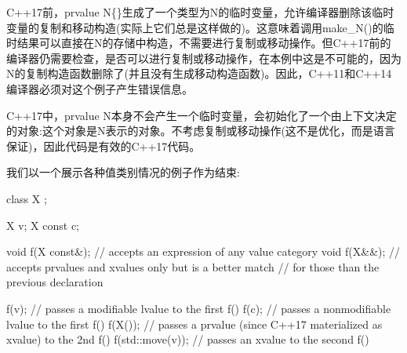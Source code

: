 C++17前，prvalue N\{\}生成了一个类型为N的临时变量，允许编译器删除该临时变量的复制和移动构造(实际上它们总是这样做的)。这意味着调用make\_N()的临时结果可以直接在N的存储中构造，不需要进行复制或移动操作。但C++17前的编译器仍需要检查，是否可以进行复制或移动操作，在本例中这是不可能的，因为N的复制构造函数删除了(并且没有生成移动构造函数)。因此，C++11和C++14编译器必须对这个例子产生错误信息。

C++17中，prvalue N本身不会产生一个临时变量，会初始化了一个由上下文决定的对象:这个对象是N表示的对象。不考虑复制或移动操作(这不是优化，而是语言保证)，因此代码是有效的C++17代码。

我们以一个展示各种值类别情况的例子作为结束:

\begin{cpp}
class X {
};

X v;
X const c;

void f(X const&); // accepts an expression of any value category
void f(X&&); // accepts prvalues and xvalues only but is a better match
			// for those than the previous declaration

f(v); // passes a modifiable lvalue to the first f()
f(c); // passes a nonmodifiable lvalue to the first f()
f(X()); // passes a prvalue (since C++17 materialized as xvalue) to the 2nd f()
f(std::move(v)); // passes an xvalue to the second f()
\end{cpp}









